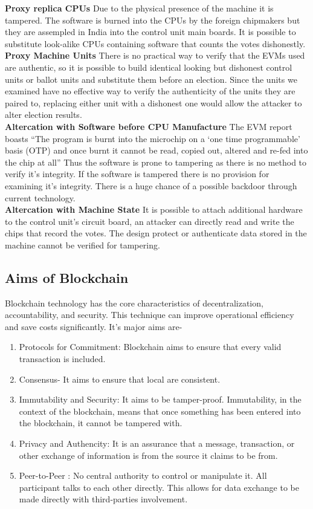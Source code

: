 \documentclass{article}
\begin{document}
\textbf{Proxy replica CPUs} Due to the physical presence of the machine it is tampered. The software is burned into the CPUs by the foreign chipmakers but they are assempled in India into the control unit main boards. It is possible to substitute look-alike CPUs containing software that counts the votes dishonestly. 
\\
\textbf{Proxy Machine Units} There is no practical way to verify that the EVMs used are authentic, so it is possible to build identical looking but dishonest control units or ballot units and substitute them before an election. Since the units we examined have no effective way to verify the authenticity of the units they are paired to, replacing either unit with a dishonest one would allow the attacker to alter election results.
\\
\textbf{Altercation with Software before CPU Manufacture} The EVM report boasts “The program is burnt into the microchip on a ‘one time programmable’ basis (OTP) and once burnt it cannot be read, copied out, altered and re-fed into the chip at all” Thus the software is prone to tampering as there is no method to verify it’s integrity. If the software is tampered there is no provision for examining it’s integrity. There is a huge chance of a possible backdoor through current technology.\\
\textbf{Altercation with Machine State} It is possible to attach additional hardware to the control unit’s circuit board, an attacker can directly read and write the chips that record the votes. The design protect or authenticate data stored in the machine cannot be verified for tampering.\\
\subsection{Aims of Blockchain}
Blockchain technology has the core characteristics of decentralization, accountability, and security. This technique can improve operational efficiency and save costs significantly. It's major aims are-
\begin{enumerate}
     

    \item Protocols for Commitment: Blockchain aims to ensure that every valid transaction is included.
    \item Consensus- It aims to ensure that local are consistent.
    \item Immutability and Security: It aims to be tamper-proof. Immutability, in the context of the blockchain, means that once something has been entered into the blockchain, it cannot be tampered with.
    \item Privacy and Authencity:  It is an assurance that a message, transaction, or other exchange of information is from the source it claims to be from.
    \item Peer-to-Peer : No central authority to control or manipulate it. All participant talks to each other directly. This allows for data exchange to be made directly with third-parties involvement.
\end{enumerate}
\end{document}

